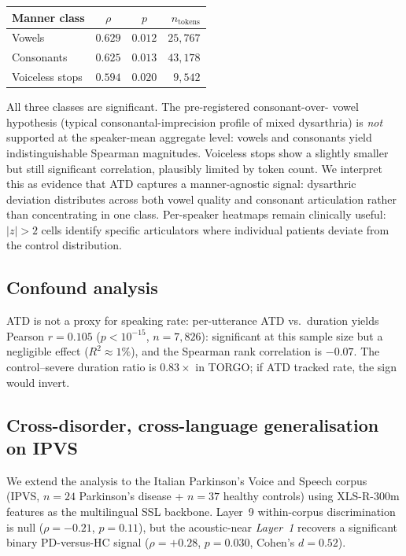 \begin{tabular}{lccr}
\toprule
Manner class & $\rho$ & $p$ & $n_\mathrm{tokens}$ \\
\midrule
Vowels           & $0.629$ & $0.012$ & $25{,}767$ \\
Consonants       & $0.625$ & $0.013$ & $43{,}178$ \\
Voiceless stops  & $0.594$ & $0.020$ & $9{,}542$  \\
\bottomrule
\end{tabular}

All three classes are significant. The pre-registered consonant-over-
vowel hypothesis (typical consonantal-imprecision profile of mixed
dysarthria) is \emph{not} supported at the speaker-mean aggregate level:
vowels and consonants yield indistinguishable Spearman magnitudes.
Voiceless stops show a slightly smaller but still significant
correlation, plausibly limited by token count. We interpret this as
evidence that ATD captures a manner-agnostic signal: dysarthric
deviation distributes across both vowel quality and consonant
articulation rather than concentrating in one class. Per-speaker
heatmaps remain clinically useful: $|z| > 2$ cells identify specific
articulators where individual patients deviate from the control
distribution.

\subsection{Confound analysis}
ATD is not a proxy for speaking rate: per-utterance ATD vs.\ duration
yields Pearson $r = 0.105$ ($p < 10^{-15}$, $n = 7{,}826$): significant at
this sample size but a negligible effect ($R^2 \approx 1\%$), and the
Spearman rank correlation is $-0.07$. The control--severe
duration ratio is $0.83\times$ in TORGO; if ATD tracked rate, the sign
would invert.

\subsection{Cross-disorder, cross-language generalisation on IPVS}
\label{sec:cross-corpus}
We extend the analysis to the Italian Parkinson's Voice and Speech
corpus (IPVS, $n{=}24$ Parkinson's disease + $n{=}37$ healthy controls)
using XLS-R-300m features as the multilingual SSL backbone. Layer~9
within-corpus discrimination is null ($\rho{=}{-}0.21$, $p{=}0.11$),
but the acoustic-near \emph{Layer~1} recovers a significant binary
PD-versus-HC signal ($\rho{=}+0.28$, $p{=}0.030$, Cohen's $d{=}0.52$).

